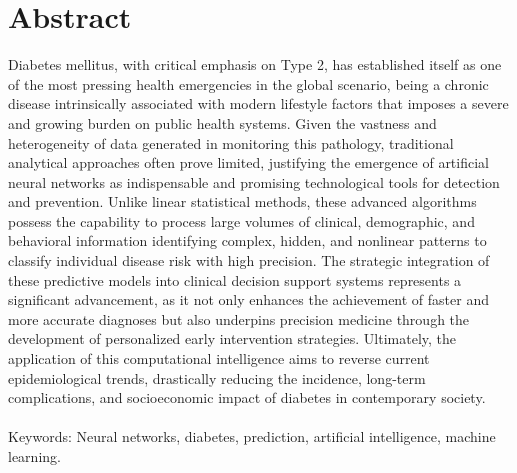 \chapter*{Abstract}
\thispagestyle{empty}

Diabetes mellitus, with critical emphasis on Type 2, has established itself as one of the most pressing health emergencies in the global scenario, being a chronic disease intrinsically associated with modern lifestyle factors that imposes a severe and growing burden on public health systems. Given the vastness and heterogeneity of data generated in monitoring this pathology, traditional analytical approaches often prove limited, justifying the emergence of artificial neural networks as indispensable and promising technological tools for detection and prevention. Unlike linear statistical methods, these advanced algorithms possess the capability to process large volumes of clinical, demographic, and behavioral information identifying complex, hidden, and nonlinear patterns to classify individual disease risk with high precision. The strategic integration of these predictive models into clinical decision support systems represents a significant advancement, as it not only enhances the achievement of faster and more accurate diagnoses but also underpins precision medicine through the development of personalized early intervention strategies. Ultimately, the application of this computational intelligence aims to reverse current epidemiological trends, drastically reducing the incidence, long-term complications, and socioeconomic impact of diabetes in contemporary society.
\\\\
Keywords: Neural networks, diabetes, prediction, artificial intelligence, machine learning.